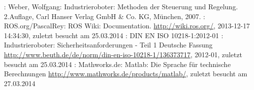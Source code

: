 \begin{thebibliography}{XXXXXX-JJJJa}



\renewcommand{\bibname}{A. ~Literaturverzeichnis}
\setcounter{chapter}{1}



: Weber, Wolfgang: Industrieroboter: Methoden der Steuerung und Regelung. 2.Auflage, Carl Hanser Verlag GmbH \& Co. KG, München, 2007.
: ROS.org/PascalRey: ROS Wiki: Documentation. \url{http://wiki.ros.org/}, 2013-12-17 14:34:30, zuletzt besucht am 25.03.2014
: DIN EN ISO 10218-1:2012-01 : Industrieroboter: Sicherheitsanforderungen - Teil 1 Deutsche Fassung \url{http://www.beuth.de/de/norm/din-en-iso-10218-1/136373717}, 2012-01, zuletzt besucht am 25.03.2014
: Mathworks.de: Matlab: Die Sprache für technische Berechnungen \url{http://www.mathworks.de/products/matlab/}, zuletzt besucht am 27.03.2014


\end{thebibliography}
